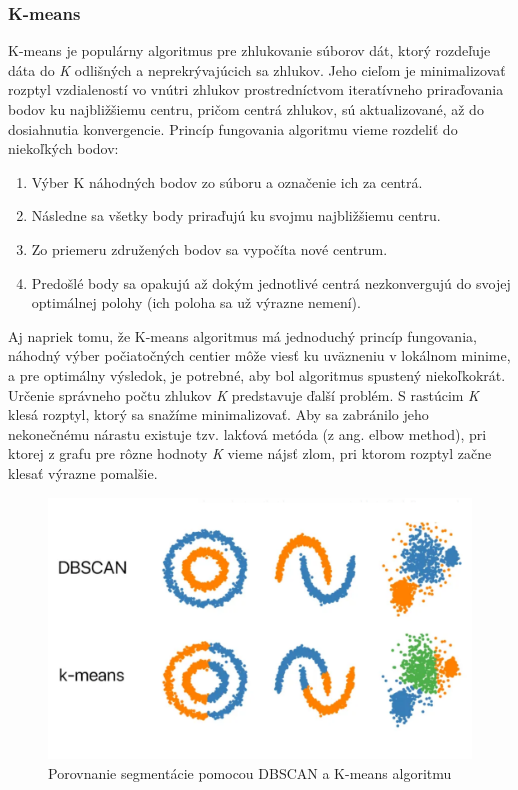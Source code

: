 \subsubsection{K-means}
\noindent K-means je populárny algoritmus pre zhlukovanie súborov dát, ktorý rozdeľuje dáta do \textit{K} odlišných a neprekrývajúcich sa zhlukov. Jeho cieľom je minimalizovať rozptyl vzdialeností vo vnútri zhlukov prostredníctvom iteratívneho priraďovania bodov ku najbližšiemu centru, pričom centrá zhlukov, sú aktualizované, až do dosiahnutia konvergencie. \cite{K-means}
\newline\indent Princíp fungovania algoritmu vieme rozdeliť do niekoľkých bodov:
\begin{enumerate}
    \item Výber K náhodných bodov zo súboru a označenie ich za centrá. 
    \item Následne sa všetky body priraďujú ku svojmu najbližšiemu centru.
    \item Zo priemeru združených bodov sa vypočíta nové centrum.
    \item Predošlé body sa opakujú až dokým jednotlivé centrá nezkonvergujú do svojej optimálnej  polohy (ich poloha sa už výrazne nemení).
\end{enumerate}
\indent Aj napriek tomu, že K-means algoritmus má jednoduchý princíp fungovania, náhodný výber počiatočných centier môže viesť ku uväzneniu v lokálnom minime, a pre optimálny výsledok, je potrebné, aby bol algoritmus spustený niekoľkokrát. Určenie správneho počtu zhlukov \textit{K} predstavuje ďalší problém. S rastúcim \textit{K} klesá rozptyl, ktorý sa snažíme minimalizovať. Aby sa zabránilo jeho nekonečnému nárastu existuje tzv. lakťová metóda (z ang. elbow method), pri ktorej z grafu pre rôzne hodnoty \textit{K} vieme nájsť zlom, pri ktorom rozptyl začne klesať výrazne pomalšie. \cite{K-means}
\begin{figure}[!htbp]
  \centering
  \includegraphics[width=13cm]{img/DBSCAN_vs_Kmeans.png}
  \caption{Porovnanie segmentácie pomocou DBSCAN a K-means algoritmu \cite{DBSCANvsKmeans}}
  \label{DBSCAN_vs_Kmeans}
\end{figure} 

